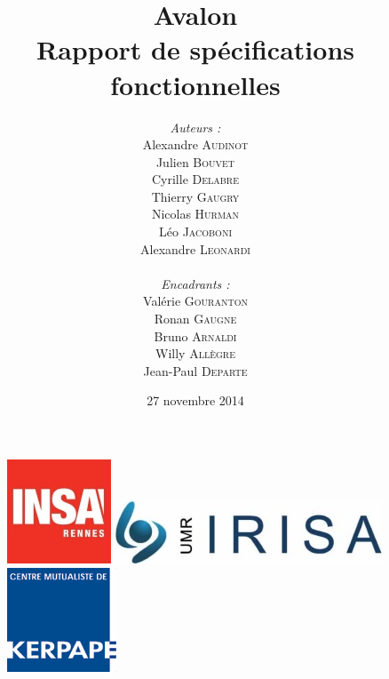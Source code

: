 \documentclass[a4paper,11pt]{article}
\title{
  \textbf{Avalon}\\
  Rapport de spécifications fonctionnelles
}
\author{
\begin{minipage}{0.4\textwidth}
	\begin{flushleft} \large
		\emph{Auteurs :}\\
		Alexandre \textsc{Audinot}\\
		Julien \textsc{Bouvet}\\
		Cyrille \textsc{Delabre}\\
		Thierry \textsc{Gaugry}\\
		Nicolas \textsc{Hurman}\\
		Léo \textsc{Jacoboni}\\
		Alexandre \textsc{Leonardi}\\
	\end{flushleft}
\end{minipage}
\begin{minipage}{0.4\textwidth}
	\begin{flushright} \large
		\emph{Encadrants :} \\
		Valérie \textsc{Gouranton}\\
		Ronan \textsc{Gaugne}\\
		Bruno \textsc{Arnaldi}\\
		Willy \textsc{Allègre}\\
		Jean-Paul  \textsc{Departe}\\
	\end{flushright}
\end{minipage}
}
\date{27 novembre 2014}
\begin{document}
\maketitle
\thispagestyle{empty}

\begin{figure}[h!]
   \begin{minipage}{0.3\linewidth}
      \includegraphics[scale=0.9]{2-Specifications/img/logo_insa.jpeg}
   \end{minipage}
   \begin{minipage}{0.2\linewidth}
      \centering
      \includegraphics[scale=0.5,left]{2-Specifications/img/logo_irisa.jpg}
   \end{minipage}\hfill
   \begin{minipage}{0.2\linewidth}
      \includegraphics[scale=0.9]{2-Specifications/img/logo_kerpape.png}
   \end{minipage}
\end{figure}


\pagebreak

\tableofcontents
\pagebreak



\pagebreak

\pagebreak

\pagebreak

\pagebreak

\end{document}
